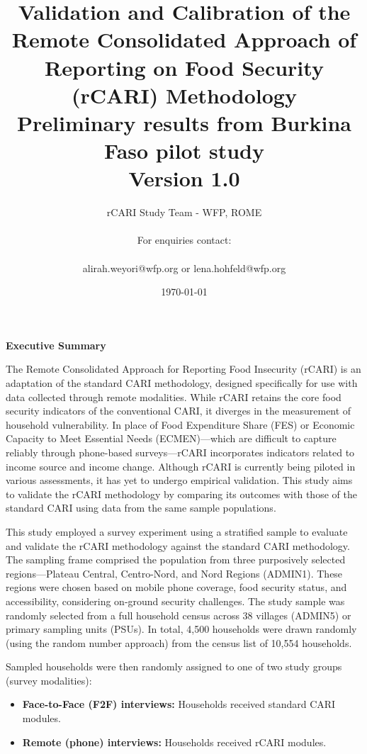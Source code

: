 \documentclass[11pt,harvard]{article}
\author{rCARI Study Team - WFP, ROME \\	\\For enquiries contact:\\		\\alirah.weyori@wfp.org or lena.hohfeld@wfp.org}
\date{\today}
\title{Validation and Calibration of the Remote Consolidated Approach of Reporting on Food Security (rCARI) Methodology 
	\\ {\normalsize Preliminary results from Burkina Faso pilot study} 
	\\{\normalsize{Version 1.0}} }
\begin{document}
	\maketitle \vspace{-1cm}
	\onehalfspacing
	\pagebreak
	\setlength{\parskip}{6pt} %
	\tableofcontents
	\pagebreak
	
	
	\textbf{Executive Summary}
	
	The Remote Consolidated Approach for Reporting Food Insecurity (rCARI) is an adaptation of the standard CARI methodology, designed specifically for use with data collected through remote modalities. While rCARI retains the core food security indicators of the conventional CARI, it diverges in the measurement of household vulnerability. In place of Food Expenditure Share (FES) or Economic Capacity to Meet Essential Needs (ECMEN)—which are difficult to capture reliably through phone-based surveys—rCARI incorporates indicators related to income source and income change. Although rCARI is currently being piloted in various assessments, it has yet to undergo empirical validation. This study aims to validate the rCARI methodology by comparing its outcomes with those of the standard CARI using data from the same sample populations.

	This study employed a survey experiment using a stratified sample to evaluate and validate the rCARI methodology against the standard CARI methodology. The sampling frame comprised the population from  three purposively selected regions—Plateau Central, Centro-Nord, and Nord Regions (ADMIN1). These regions were chosen based on mobile phone coverage, food security status, and accessibility, considering on-ground security challenges. The study sample was randomly selected from a full household census across 38 villages (ADMIN5) or primary sampling units (PSUs). In total, 4,500 households were drawn randomly (using the random number approach) from the census list of 10,554 households. 

	Sampled households were then randomly assigned to one of two study groups (survey modalities):
	\begin{itemize}
		\item [1.] \textbf{Face-to-Face (F2F) interviews:} Households received standard CARI modules.
		\item [2.] \textbf{Remote (phone) interviews:} Households received rCARI modules.
	\end{itemize}
\end{document}
